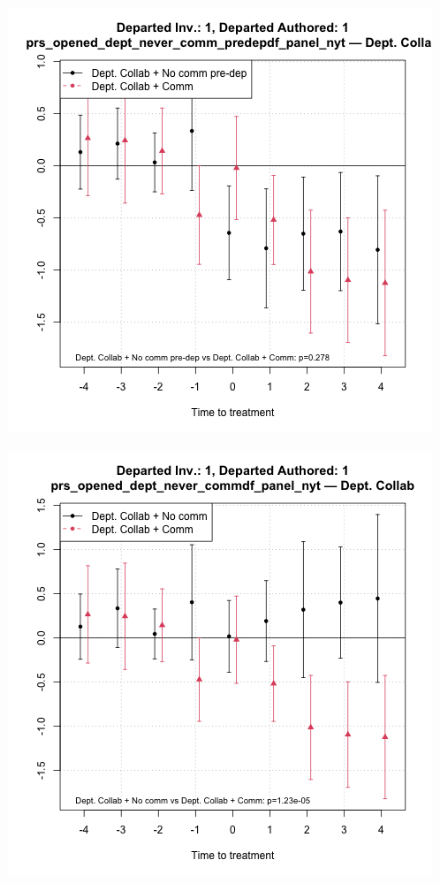 \begin{figure}[htbp]
    \centering
    \begin{minipage}[b]{0.24\textwidth}
        \centering
        \includegraphics[width=\textwidth]{temp/output/collab_imp/auth_n1_inv_n1_cs_norm_prs_opened_dept_never_comm_predep_Dept.Collab.png}
    \label{fig:prs_opened_comm_collab_nonint_predep}
    \end{minipage}
    \hfill
    \begin{minipage}[b]{0.24\textwidth}
        \centering
        \includegraphics[width=\textwidth]{temp/output/collab_imp/auth_n1_inv_n1_cs_norm_prs_opened_dept_never_comm_Dept.Collab.png}

\end{minipage}
\end{figure}
